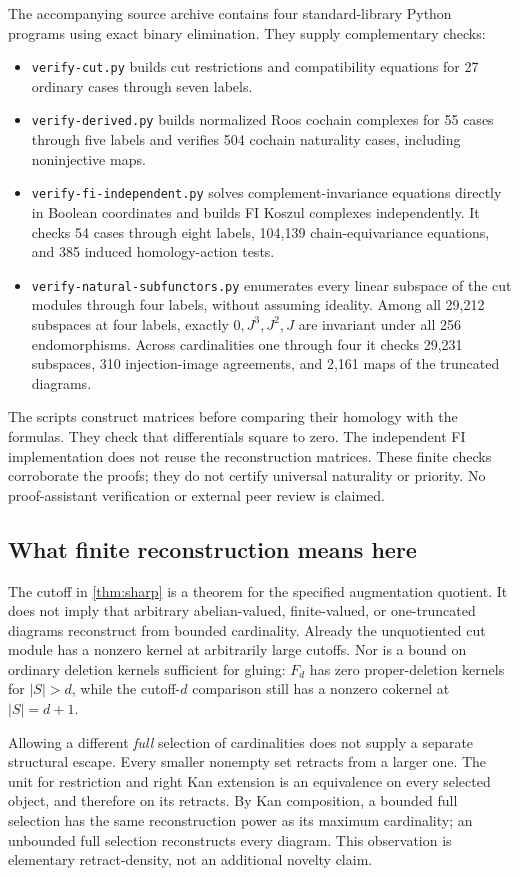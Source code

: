 \documentclass[11pt,a4paper]{article}
\theoremstyle{definition}
\theoremstyle{remark}
\begin{document}
The accompanying source archive contains four standard-library Python programs using exact binary elimination. They supply complementary checks:
\begin{itemize}
 \item \texttt{verify-cut.py} builds cut restrictions and compatibility equations for 27 ordinary cases through seven labels.
 \item \texttt{verify-derived.py} builds normalized Roos cochain complexes for 55 cases through five labels and verifies 504 cochain naturality cases, including noninjective maps.
 \item \texttt{verify-fi-independent.py} solves complement-invariance equations directly in Boolean coordinates and builds FI Koszul complexes independently. It checks 54 cases through eight labels, 104,139 chain-equivariance equations, and 385 induced homology-action tests.
 \item \texttt{verify-natural-subfunctors.py} enumerates every linear subspace of the cut modules through four labels, without assuming ideality. Among all 29,212 subspaces at four labels, exactly $0,J^3,J^2,J$ are invariant under all 256 endomorphisms. Across cardinalities one through four it checks 29,231 subspaces, 310 injection-image agreements, and 2,161 maps of the truncated diagrams.
\end{itemize}
The scripts construct matrices before comparing their homology with the formulas. They check that differentials square to zero. The independent FI implementation does not reuse the reconstruction matrices. These finite checks corroborate the proofs; they do not certify universal naturality or priority. No proof-assistant verification or external peer review is claimed.

\subsection{What finite reconstruction means here}

The cutoff in \cref{thm:sharp} is a theorem for the specified augmentation quotient. It does not imply that arbitrary abelian-valued, finite-valued, or one-truncated diagrams reconstruct from bounded cardinality. Already the unquotiented cut module has a nonzero kernel at arbitrarily large cutoffs. Nor is a bound on ordinary deletion kernels sufficient for gluing: $F_d$ has zero proper-deletion kernels for $|S|>d$, while the cutoff-$d$ comparison still has a nonzero cokernel at $|S|=d+1$.

Allowing a different \emph{full} selection of cardinalities does not supply a separate structural escape. Every smaller nonempty set retracts from a larger one. The unit for restriction and right Kan extension is an equivalence on every selected object, and therefore on its retracts. By Kan composition, a bounded full selection has the same reconstruction power as its maximum cardinality; an unbounded full selection reconstructs every diagram. This observation is elementary retract-density, not an additional novelty claim.
\end{document}
